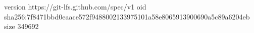 version https://git-lfs.github.com/spec/v1
oid sha256:7f8471bbd0eaace572f9488002133975101a58e8065913900690a5c89a6204eb
size 349692
